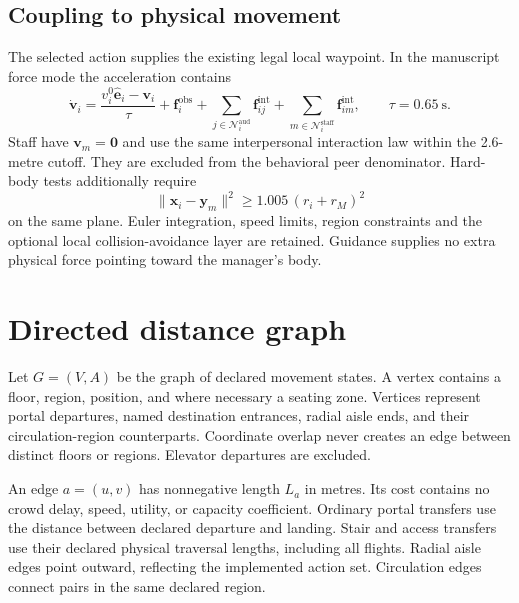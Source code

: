 \documentclass[11pt]{article}
\begin{document}
\subsection{Coupling to physical movement}
The selected action supplies the existing legal local waypoint. In the
manuscript force mode the acceleration contains
\[
 \dot{\mathbf v}_i=
 \frac{v_i^0\widehat{\mathbf e}_i-\mathbf v_i}{\tau}
 +\mathbf f_i^{\mathrm{obs}}
 +\sum_{j\in\mathcal N_i^{\mathrm{aud}}}\mathbf f_{ij}^{\mathrm{int}}
 +\sum_{m\in\mathcal N_i^{\mathrm{staff}}}\mathbf f_{im}^{\mathrm{int}},
 \qquad \tau=0.65\ \mathrm{s}.
\]
Staff have $\mathbf v_m=\mathbf 0$ and use the same interpersonal interaction
law within the 2.6-metre cutoff. They are excluded from the behavioral peer
denominator. Hard-body tests additionally require
\[
 \|\mathbf x_i-\mathbf y_m\|^2
       \geq 1.005\,(r_i+r_M)^2
\]
on the same plane. Euler integration, speed limits, region constraints and the
optional local collision-avoidance layer are retained. Guidance supplies no
extra physical force pointing toward the manager's body.

\section{Directed distance graph}
Let $G=(V,A)$ be the graph of declared movement states. A vertex contains a
floor, region, position, and where necessary a seating zone. Vertices represent
portal departures, named destination entrances, radial aisle ends, and their
circulation-region counterparts. Coordinate overlap never creates an edge
between distinct floors or regions. Elevator departures are excluded.

An edge $a=(u,v)$ has nonnegative length $L_a$ in metres. Its cost contains no
crowd delay, speed, utility, or capacity coefficient. Ordinary portal transfers
use the distance between declared departure and landing. Stair and access
transfers use their declared physical traversal lengths, including all flights.
Radial aisle edges point outward, reflecting the implemented action set.
Circulation edges connect pairs in the same declared region.
\end{document}
